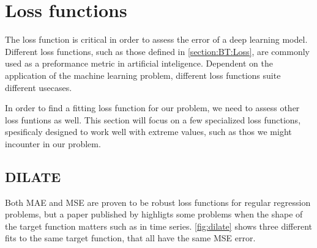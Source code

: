 
\section{Loss functions}

The loss function is critical in order to assess the error of a deep learning model.
Different loss functions, such as those defined in \ref{section:BT:Loss},
are commonly used as a preformance metric in artificial inteligence.
Dependent on the application of the machine learning problem, different loss functions suite different usecases.

In order to find a fitting loss function for our problem, we need to assess other loss funtions as well.
This section will focus on a few specialized loss functions, spesificaly designed to work well with extreme values, such as thos we might incounter in our problem.

\subsection{DILATE}

Both MAE and MSE are proven to be robust loss functions for regular regression problems,
but a paper published by \citeauthor{Guen2019} highligts some problems when the shape of the target function matters
such as in time series.
\autoref{fig:dilate} shows three different fits to the same target function, that all have
the same MSE error.

